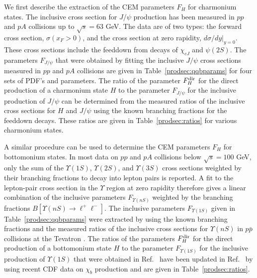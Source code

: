 We first describe the extraction of the CEM parameters $F_H$ for
charmonium states. The inclusive cross section for $J/\psi$ production
has been measured in $pp$ and $pA$ collisions up to $\sqrt{s} = 63$ GeV.
The data are of two types: the forward cross section, $\sigma(x_F > 0)$,
and the cross section at zero rapidity, $d\sigma/dy|_{y=0}$.  These
cross sections include the feeddown from decays of $\chi_{cJ}$ and
$\psi(2S)$. The parameters $F_{J/\psi}$ that were obtained by fitting
the inclusive $J/\psi$ cross sections measured in $pp$ and $pA$
collisions are given in Table~\ref{prodsec:qqbparams} for four sets of
PDF's and parameters. The ratio of the parameter $F_H^{\rm dir}$ for the
direct production of a charmonium state $H$ to the parameter $F_{J/\psi}$
for the inclusive production of $J/\psi$ can be determined from the
measured ratios of the inclusive cross sections for $H$ and $J/\psi$
using the known branching fractions for the feeddown decays. These
ratios are given in Table~\ref{prodsec:ratios} for various charmonium
states.

A similar procedure can be used to determine the CEM parameters $F_H$
for bottomonium states. In most data on $pp$ and $pA$ collisions below
$\sqrt{s} = 100$ GeV, only the sum of the $\Upsilon(1S)$,
$\Upsilon(2S)$, and $\Upsilon(3S)$ cross sections weighted by their
branching fractions to decay into lepton pairs is reported. A fit to the
lepton-pair cross section in the $\Upsilon$ region at zero rapidity
therefore gives a linear combination of the inclusive parameters 
$F_{\Upsilon(nS)}$ weighted by the branching fractions 
$B[\Upsilon(nS) \to \ell^+ \ell^-]$. 
The inclusive parameters $F_{\Upsilon(1S)}$ given in
Table~\ref{prodsec:qqbparams} were extracted by using the known
branching fractions and the measured ratios of the inclusive cross
sections for $\Upsilon(nS)$ in $p \bar p$ collisions at the Tevatron
\cite{Affolder:1999wm}. The ratios of the parameters $F_H^{\rm dir}$ for
the direct production of a bottomonium state $H$ to the parameter
$F_{\Upsilon(1S)}$ for the inclusive production of $\Upsilon(1S)$ that
were obtained in Ref.~\cite{Gunion:1996qc} have been updated in
Ref.~\cite{Digal:2001ue} by using recent CDF data on $\chi_b$ production
and are given in Table~\ref{prodsec:ratios}.

